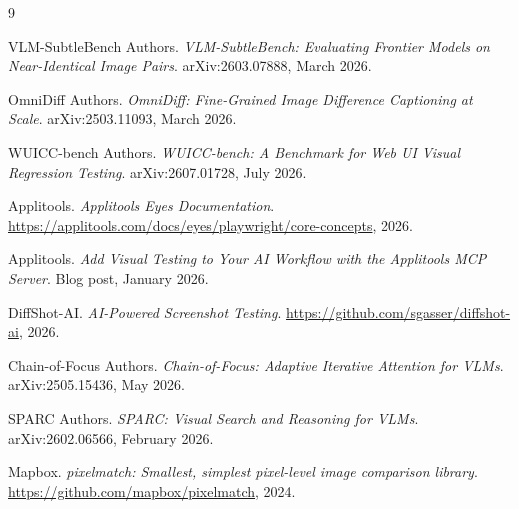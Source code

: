 \documentclass[10pt,twocolumn,letterpaper]{article}
\begin{document}

\begin{thebibliography}{9}

VLM-SubtleBench Authors.
\textit{VLM-SubtleBench: Evaluating Frontier Models on Near-Identical Image Pairs}.
arXiv:2603.07888, March 2026.

OmniDiff Authors.
\textit{OmniDiff: Fine-Grained Image Difference Captioning at Scale}.
arXiv:2503.11093, March 2026.

WUICC-bench Authors.
\textit{WUICC-bench: A Benchmark for Web UI Visual Regression Testing}.
arXiv:2607.01728, July 2026.

Applitools.
\textit{Applitools Eyes Documentation}.
\url{https://applitools.com/docs/eyes/playwright/core-concepts}, 2026.

Applitools.
\textit{Add Visual Testing to Your AI Workflow with the Applitools MCP Server}.
Blog post, January 2026.

DiffShot-AI.
\textit{AI-Powered Screenshot Testing}.
\url{https://github.com/sgasser/diffshot-ai}, 2026.

Chain-of-Focus Authors.
\textit{Chain-of-Focus: Adaptive Iterative Attention for VLMs}.
arXiv:2505.15436, May 2026.

SPARC Authors.
\textit{SPARC: Visual Search and Reasoning for VLMs}.
arXiv:2602.06566, February 2026.

Mapbox.
\textit{pixelmatch: Smallest, simplest pixel-level image comparison library}.
\url{https://github.com/mapbox/pixelmatch}, 2024.

\end{thebibliography}
\end{document}
